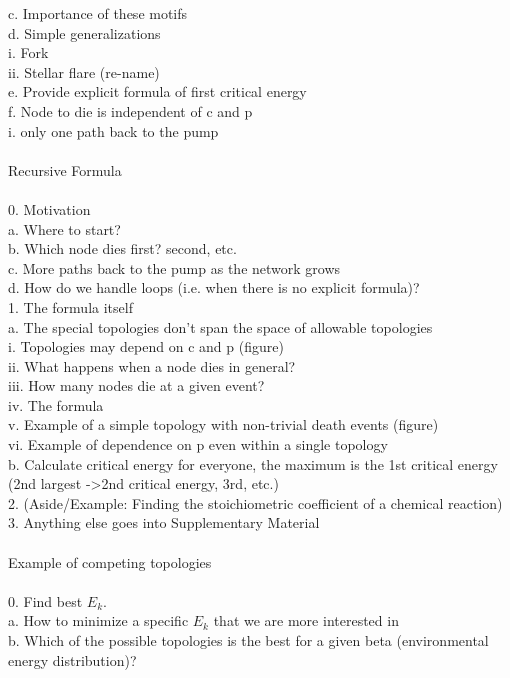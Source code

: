 \documentclass{amsart}
\theoremstyle{plain}
\numberwithin{equation}{section}
\begin{document}
 c. Importance of these motifs\\
 d. Simple generalizations\\
  i. Fork\\
	ii. Stellar flare (re-name)\\
 e. Provide explicit formula of first critical energy\\
 f. Node to die is independent of c and p\\
  i. only one path back to the pump\\
\\
Recursive Formula \\
\\
0. Motivation\\
 a. Where to start?\\
 b. Which node dies first? second, etc.\\
 c. More paths back to the pump as the network grows\\
 d. How do we handle loops (i.e. when there is no explicit formula)?\\
1. The formula itself\\
 a. The special topologies don't span the space of allowable topologies\\
  i. Topologies may depend on c and p (figure)\\
	ii. What happens when a node dies in general?\\
	iii. How many nodes die at a given event?\\
	iv. The formula\\
	v. Example of a simple topology with non-trivial death events (figure)\\
	vi. Example of dependence on p even within a single topology\\
 b. Calculate critical energy for everyone, the maximum is the 1st critical energy (2nd largest ->2nd critical energy, 3rd, etc.)\\
2. (Aside/Example: Finding the stoichiometric coefficient of a chemical reaction)\\
3. Anything else goes into Supplementary Material\\
\\
Example of competing topologies\\
\\
0. Find best $E_k$. \\
 a. How to minimize a specific $E_k$ that we are more interested in\\
 b. Which of the possible topologies is the best for a given beta (environmental energy distribution)?\\
\end{document}
